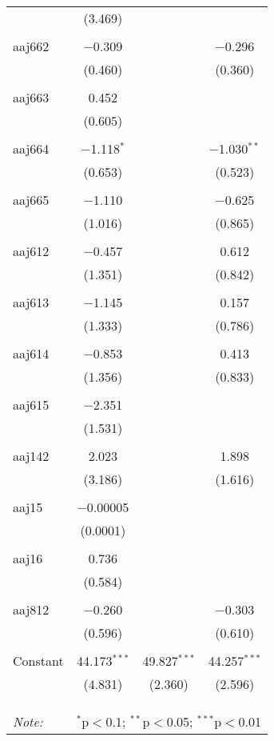 \begin{table}[!htbp]
\begin{tabular}{@{\extracolsep{5pt}}lccc}
  & (3.469) &  &  \\ 
  & & & \\ 
 aaj662 & $-$0.309 &  & $-$0.296 \\ 
  & (0.460) &  & (0.360) \\ 
  & & & \\ 
 aaj663 & 0.452 &  &  \\ 
  & (0.605) &  &  \\ 
  & & & \\ 
 aaj664 & $-$1.118$^{*}$ &  & $-$1.030$^{**}$ \\ 
  & (0.653) &  & (0.523) \\ 
  & & & \\ 
 aaj665 & $-$1.110 &  & $-$0.625 \\ 
  & (1.016) &  & (0.865) \\ 
  & & & \\ 
 aaj612 & $-$0.457 &  & 0.612 \\ 
  & (1.351) &  & (0.842) \\ 
  & & & \\ 
 aaj613 & $-$1.145 &  & 0.157 \\ 
  & (1.333) &  & (0.786) \\ 
  & & & \\ 
 aaj614 & $-$0.853 &  & 0.413 \\ 
  & (1.356) &  & (0.833) \\ 
  & & & \\ 
 aaj615 & $-$2.351 &  &  \\ 
  & (1.531) &  &  \\ 
  & & & \\ 
 aaj142 & 2.023 &  & 1.898 \\ 
  & (3.186) &  & (1.616) \\ 
  & & & \\ 
 aaj15 & $-$0.00005 &  &  \\ 
  & (0.0001) &  &  \\ 
  & & & \\ 
 aaj16 & 0.736 &  &  \\ 
  & (0.584) &  &  \\ 
  & & & \\ 
 aaj812 & $-$0.260 &  & $-$0.303 \\ 
  & (0.596) &  & (0.610) \\ 
  & & & \\ 
 Constant & 44.173$^{***}$ & 49.827$^{***}$ & 44.257$^{***}$ \\ 
  & (4.831) & (2.360) & (2.596) \\ 
  & & & \\ 
\hline \\[-1.8ex] 
\hline 
\hline \\[-1.8ex] 
\textit{Note:}  & \multicolumn{3}{r}{$^{*}$p$<$0.1; $^{**}$p$<$0.05; $^{***}$p$<$0.01} \\ 
\end{tabular} 
\end{table} 

